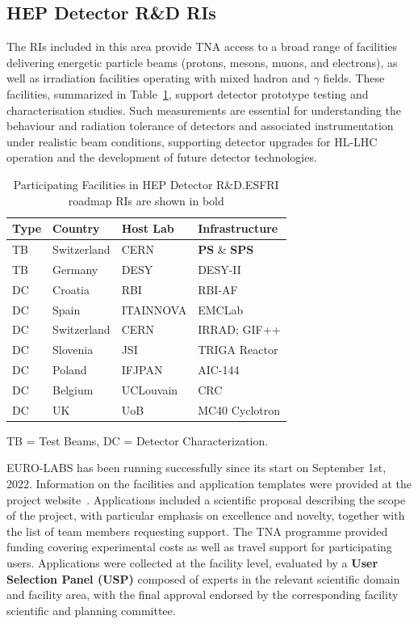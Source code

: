 \begin{itemize}
\subsection{HEP Detector R\&D RIs}

The RIs included in this area provide TNA access to a broad range of facilities delivering energetic particle beams (protons, mesons, muons, and electrons), as well as irradiation facilities operating with mixed hadron and $\gamma$ fields. These facilities, summarized in Table~\ref{tabl:wp4-ris}, support detector prototype testing and characterisation studies. Such measurements are essential for understanding the behaviour and radiation tolerance of detectors and associated instrumentation under realistic beam conditions, supporting detector upgrades for HL-LHC operation and the development of future detector technologies.

\begin{table}[htb]
\centering
\caption{Participating Facilities in HEP Detector R\&D.ESFRI roadmap RIs are shown in bold}
\small
\begin{tabular}{
p{}
p{}
p{}
p{}
}
\toprule
\textbf{Type} & \textbf{Country} & \textbf{Host Lab} & \textbf{Infrastructure} \\
\midrule
TB & Switzerland & CERN & \textbf{PS} \& \textbf{SPS} \\
TB & Germany & DESY & DESY-II \\
DC & Croatia & RBI & RBI-AF \\
DC & Spain & ITAINNOVA & EMCLab \\
DC & Switzerland & CERN & IRRAD; GIF++ \\
DC & Slovenia & JSI & TRIGA Reactor \\
DC & Poland & IFJPAN & AIC-144 \\
DC & Belgium & UCLouvain & CRC \\
DC & UK & UoB & MC40 Cyclotron \\
\bottomrule
\end{tabular}

\vspace{1mm}
\raggedright
\footnotesize
TB = Test Beams,
DC = Detector Characterization.
\label{tabl:wp4-ris}
\end{table}

EURO-LABS has been running successfully since its start on September 1st, 2022. Information on the facilities and application templates were provided at the project website~\cite{euro-labs}. Applications included a scientific proposal describing the scope of the project, with particular emphasis on excellence and novelty, together with the list of team members requesting support. The TNA programme provided funding covering experimental costs as well as travel support for participating users. 
Applications were collected at the facility level, evaluated by a \textbf{User Selection Panel (USP)} composed of experts in the relevant scientific domain and facility area, with the final approval endorsed by the corresponding facility scientific and planning committee. 


\end{itemize}
